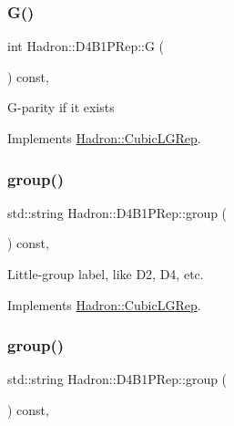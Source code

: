 \subsubsection{\texorpdfstring{G()}{G()}\hspace{0.1cm}{\footnotesize\ttfamily [2/2]}}
{\footnotesize\ttfamily int Hadron\+::\+D4\+B1\+P\+Rep\+::G (\begin{DoxyParamCaption}{ }\end{DoxyParamCaption}) const\hspace{0.3cm}{\ttfamily [inline]}, {\ttfamily [virtual]}}

G-\/parity if it exists 

Implements \mbox{\hyperlink{structHadron_1_1CubicLGRep_ace26f7b2d55e3a668a14cb9026da5231}{Hadron\+::\+Cubic\+L\+G\+Rep}}.

\mbox{\label{structHadron_1_1D4B1PRep_a2826854e4c6a3edb94112b11b577702b}} 
\subsubsection{\texorpdfstring{group()}{group()}\hspace{0.1cm}{\footnotesize\ttfamily [1/2]}}
{\footnotesize\ttfamily std\+::string Hadron\+::\+D4\+B1\+P\+Rep\+::group (\begin{DoxyParamCaption}{ }\end{DoxyParamCaption}) const\hspace{0.3cm}{\ttfamily [inline]}, {\ttfamily [virtual]}}

Little-\/group label, like D2, D4, etc. 

Implements \mbox{\hyperlink{structHadron_1_1CubicLGRep_a9bdb14b519a611d21379ed96a3a9eb41}{Hadron\+::\+Cubic\+L\+G\+Rep}}.

\mbox{\label{structHadron_1_1D4B1PRep_a2826854e4c6a3edb94112b11b577702b}} 
\subsubsection{\texorpdfstring{group()}{group()}\hspace{0.1cm}{\footnotesize\ttfamily [2/2]}}
{\footnotesize\ttfamily std\+::string Hadron\+::\+D4\+B1\+P\+Rep\+::group (\begin{DoxyParamCaption}{ }\end{DoxyParamCaption}) const\hspace{0.3cm}{\ttfamily [inline]}, {\ttfamily [virtual]}}

